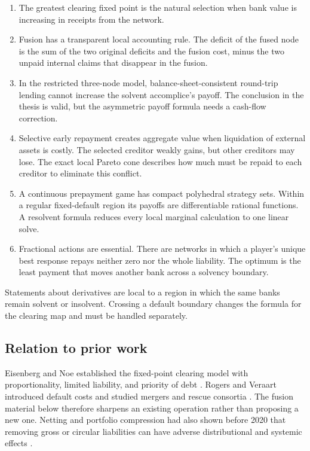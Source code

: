 \documentclass[11pt]{article}
\theoremstyle{definition}
\theoremstyle{remark}
\begin{document}
\begin{enumerate}[label=(\roman*)]
  \item The greatest clearing fixed point is the natural selection when bank
  value is increasing in receipts from the network.

  \item Fusion has a transparent local accounting rule.  The deficit of the
  fused node is the sum of the two original deficits and the fusion cost,
  minus the two unpaid internal claims that disappear in the fusion.

  \item In the restricted three-node model, balance-sheet-consistent
  round-trip lending cannot increase the solvent accomplice's payoff.  The
  conclusion in the thesis is valid, but the asymmetric payoff formula needs
  a cash-flow correction.

  \item Selective early repayment creates aggregate value when liquidation of
  external assets is costly.  The selected creditor weakly gains, but other
  creditors may lose.  The exact local Pareto cone describes how much must be
  repaid to each creditor to eliminate this conflict.

  \item A continuous prepayment game has compact polyhedral strategy sets.
  Within a regular fixed-default region its payoffs are differentiable rational
  functions.  A resolvent formula reduces every local marginal calculation to
  one linear solve.

  \item Fractional actions are essential.  There are networks in which a
  player's unique best response repays neither zero nor the whole liability.
  The optimum is the least payment that moves another bank across a solvency
  boundary.
\end{enumerate}

Statements about derivatives are local to a region in which the same banks
remain solvent or insolvent.  Crossing a default boundary changes the formula
for the clearing map and must be handled separately.

\subsection{Relation to prior work}

Eisenberg and Noe established the fixed-point clearing model with
proportionality, limited liability, and priority of debt
\cite{EisenbergNoe2001}.  Rogers and Veraart introduced default costs and
studied mergers and rescue consortia \cite{RogersVeraart2013}.  The fusion
material below therefore sharpens an existing operation rather than proposing
a new one.  Netting and portfolio compression had also shown before 2020 that
removing gross or circular liabilities can have adverse distributional and
systemic effects \cite{AminiEtAl2016,SchuldenzuckerSeuken2020}.
\end{document}
